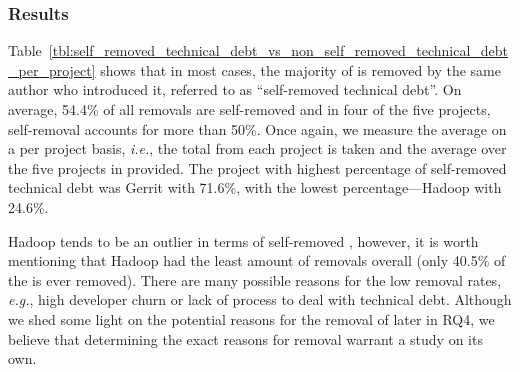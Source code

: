 \subsubsection*{Results} Table~\ref{tbl:self_removed_technical_debt_vs_non_self_removed_technical_debt_per_project} shows that in most cases, the majority of \SATD is removed by the same author who introduced it, referred to as ``self-removed technical debt''. On average, 54.4\% of all removals are self-removed and in four of the five projects, self-removal accounts for more than 50\%. Once again, we measure the average on a per project basis, \emph{i.e.}, the total from each project is taken and the average over the five projects in provided. The project with highest percentage of self-removed technical debt was Gerrit with 71.6\%, with the lowest percentage---Hadoop with 24.6\%. %

Hadoop tends to be an outlier in terms of self-removed \SATD, however, it is worth mentioning that Hadoop had the least amount of removals overall (only 40.5\% of the \SATD is ever removed). There are many possible reasons for the low removal rates, \emph{e.g.}, high developer churn or lack of process to deal with technical debt. Although we shed some light on the potential reasons for the removal of \SATD later in RQ4, we believe that determining the exact reasons for \SATD removal warrant a study on its own.







\subsection*{\rqiii}

